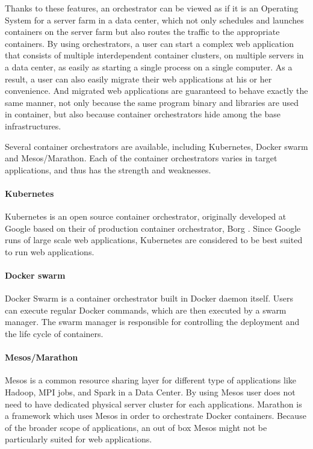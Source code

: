 Thanks to these features, an orchestrator can be viewed as if it is an Operating System for a server farm in a data center, which not only schedules and launches containers on the server farm but also routes the traffic to the appropriate containers.
By using orchestrators, a user can start a complex web application that consists of multiple interdependent container clusters, on multiple servers in a data center, as easily as starting a single process on a single computer.
As a result,  a user can also easily migrate their web applications at his or her convenience.
And migrated web applications are guaranteed to behave exactly the same manner, not only because the same program binary and libraries are used in container, but also because container orchestrators hide  among the base infrastructures.

Several container orchestrators are available, including Kubernetes, Docker swarm and Mesos/Marathon.
Each of the container orchestrators varies in target applications, and thus has the strength and weaknesses.

\paragraph{Kubernetes}
Kubernetes \cite{burns2016borg} is an open source container orchestrator, originally developed at Google based on their  of production container orchestrator, Borg \cite{Verma2015}. 
Since Google runs  of large scale web applications, Kubernetes are considered to be best suited to run web applications.

\paragraph{Docker swarm}
Docker Swarm is a container orchestrator built in Docker daemon itself.
Users can execute regular Docker commands, which are then executed by a swarm manager. 
The swarm manager is responsible for controlling the deployment and the life cycle of containers.

\paragraph{Mesos/Marathon}
Mesos \cite{hindman2011mesos} is a common resource sharing layer for different type of applications like Hadoop, MPI jobs, and Spark in a Data Center. 
By using Mesos user does not need to have dedicated physical server cluster for each applications.
Marathon is a framework which uses Mesos in order to orchestrate Docker containers.
Because of the broader scope of applications, an out of box Mesos might not be particularly suited for web applications.

